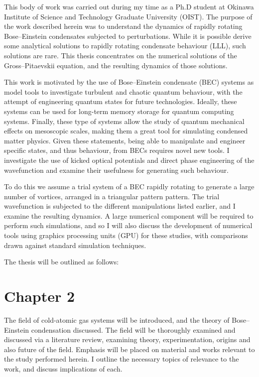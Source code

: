 
This body of work was carried out during my time as a Ph.D student at Okinawa Institute of Science and Technology Graduate University (OIST). The purpose of the work described herein was to understand the dynamics of rapidly rotating Bose--Einstein condensates subjected to perturbations. While it is possible derive some analytical solutions to rapidly rotating condensate behaviour (LLL), such solutions are rare. This thesis concentrates on the numerical solutions of the Gross--Pitaevskii equation, and the resulting dynamics of those solutions.

This work is motivated by the use of Bose--Einstein condensate (BEC) systems as model tools to investigate turbulent and chaotic quantum behaviour, with the attempt of engineering quantum states for future technologies. Ideally, these systems can be used for long-term memory storage for quantum computing systems. Finally, these type of systems allow the study of quantum mechanical effects on mesoscopic scales, making them a great tool for simulating condensed matter physics. Given these statements, being able to manipulate and engineer specific states, and thus behaviour, from BECs requires novel new tools. I investigate the use of kicked optical potentials and direct phase engineering of the wavefunction and examine their usefulness for generating such behaviour.

To do this we assume a trial system of a BEC rapidly rotating to generate a large number of vortices, arranged in a triangular pattern pattern. The trial wavefunction is subjected to the different manipulations listed earlier, and I examine the resulting dynamics. A large numerical component will be required to perform such simulations, and so I will also discuss the development of numerical tools using graphics processing units (GPU) for these studies, with comparisons drawn against standard simulation techniques.

The thesis will be outlined as follows:

\section{Chapter 2}
The field of cold-atomic gas systems will be introduced, and the theory of Bose--Einstein condensation discussed. The field will be thoroughly examined and discussed via a literature review, examining theory, experimentation, origins and also future of the field. Emphasis will be placed on material and works relevant to the study performed herein. I outline the necessary topics of relevance to the work, and discuss implications of each.

